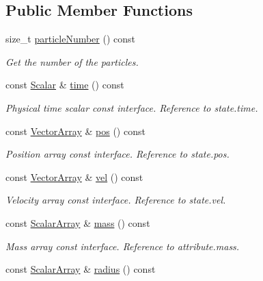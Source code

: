 \subsection*{Public Member Functions}
\begin{DoxyCompactItemize}
\item 
size\+\_\+t \mbox{\hyperlink{classparticles_ad164b86b435051fc2f452d07715d0af7}{particle\+Number}} () const
\begin{DoxyCompactList}\small\item\em Get the number of the particles. \end{DoxyCompactList}\item 
const \mbox{\hyperlink{classparticles_a57a6b6582045a4b20742b99c513e9f63}{Scalar}} \& \mbox{\hyperlink{classparticles_a4b70f028165f9cb6bd510c824bd16cc1}{time}} () const
\begin{DoxyCompactList}\small\item\em Physical time scalar const interface. Reference to state.\+time. \end{DoxyCompactList}\item 
const \mbox{\hyperlink{classparticles_ac5dddc8c666e4f7057b5109f95926363}{Vector\+Array}} \& \mbox{\hyperlink{classparticles_a746aa73a995101af269d0a64c76319a2}{pos}} () const
\begin{DoxyCompactList}\small\item\em Position array const interface. Reference to state.\+pos. \end{DoxyCompactList}\item 
const \mbox{\hyperlink{classparticles_ac5dddc8c666e4f7057b5109f95926363}{Vector\+Array}} \& \mbox{\hyperlink{classparticles_ab6116d23f77eb1e10c0b755f3f273c8b}{vel}} () const
\begin{DoxyCompactList}\small\item\em Velocity array const interface. Reference to state.\+vel. \end{DoxyCompactList}\item 
const \mbox{\hyperlink{classparticles_ac88daa0d493d17c5ca2fe3a1d3fe4779}{Scalar\+Array}} \& \mbox{\hyperlink{classparticles_a3da22fd5985987373cf7d5355320374a}{mass}} () const
\begin{DoxyCompactList}\small\item\em Mass array const interface. Reference to attribute.\+mass. \end{DoxyCompactList}\item 
const \mbox{\hyperlink{classparticles_ac88daa0d493d17c5ca2fe3a1d3fe4779}{Scalar\+Array}} \& \mbox{\hyperlink{classparticles_a2f307a8b96534016614d4665ddfbe547}{radius}} () const

\end{DoxyCompactItemize}
